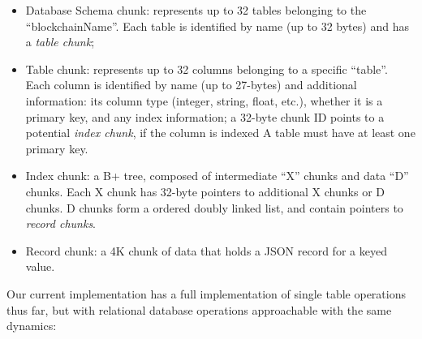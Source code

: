 \documentclass{article}
\begin{document}
\begin{itemize}
\item Database Schema chunk: represents up to 32 tables belonging to the ``blockchainName''.  Each table is identified by name (up to 32 bytes) and has a {\em table chunk};
\item Table chunk: represents up to 32 columns belonging to a specific ``table''.  Each column is identified by name (up to 27-bytes) and additional information: its column type (integer, string, float, etc.), whether it is a primary key, and any index information; a 32-byte chunk ID points to a potential {\em index chunk}, if the column is indexed
A table must have at least one primary key.
\item Index chunk:  a B+ tree, composed of intermediate ``X'' chunks and data ``D'' chunks. Each X chunk has 32-byte pointers to additional X chunks or D chunks. D chunks form a ordered doubly linked list, and contain pointers to {\em record chunks}.
\item Record chunk: a 4K chunk of data that holds a JSON record for a keyed value.
\end{itemize}
Our current implementation has a full implementation of single table operations thus far, but with relational database operations approachable with the same dynamics:
\end{document}
